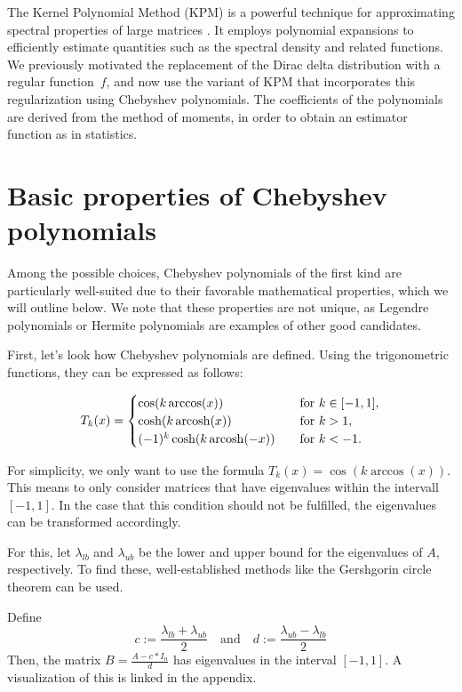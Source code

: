 The Kernel Polynomial Method (KPM) is a powerful technique for approximating spectral properties of large matrices \cite{weisse2006,linsaadyang14}. It employs polynomial expansions to efficiently estimate quantities such as the spectral density and related functions. We previously motivated the replacement of the Dirac delta distribution with a regular function~$f$, and now use the variant of KPM that incorporates this regularization using Chebyshev polynomials.
The coefficients of the polynomials are derived from the method of moments, in order to obtain an estimator function as in statistics.

\section{Basic properties of Chebyshev polynomials}
Among the possible choices, Chebyshev polynomials of the first kind are particularly well-suited due to their favorable mathematical properties, which we will outline below. We note that these properties are not unique, as Legendre polynomials or Hermite polynomials are examples of other good candidates.

First, let's look how Chebyshev polynomials are defined.
Using the trigonometric functions, they can be expressed as follows:

\[ T_k(x) =
\begin{cases}

\cos(k \arccos(x))                & \quad \text{for } k \in [-1, 1],\\
    \cosh(k \operatorname{arcosh}(x))           & \quad \text{for } k > 1,\\
    (-1)^k \cosh(k \operatorname{arcosh}(-x))   & \quad \text{for } k < -1.
\end{cases}
\]

For simplicity, we only want to use the formula $T_k(x) = \cos(k \arccos(x))$.
This means to only consider matrices that have eigenvalues within the intervall $[-1, 1]$.
In the case that this condition should not be fulfilled, the eigenvalues can be transformed accordingly.

For this, let $\lambda_{lb}$ and $\lambda_{ub}$ be the lower and upper bound for the eigenvalues of $A$, respectively.
To find these, well-established methods like the Gershgorin circle theorem can be used.

Define
\[
c := \frac{\lambda_{lb} + \lambda_{ub}}{2} \quad \text{and} \quad d := \frac{\lambda_{ub} - \lambda_{lb}}{2}
\]
Then, the matrix $B = \frac{A - c*I_n}{d}$ has eigenvalues in the interval $[-1, 1]$.
A visualization of this is linked in the appendix.

